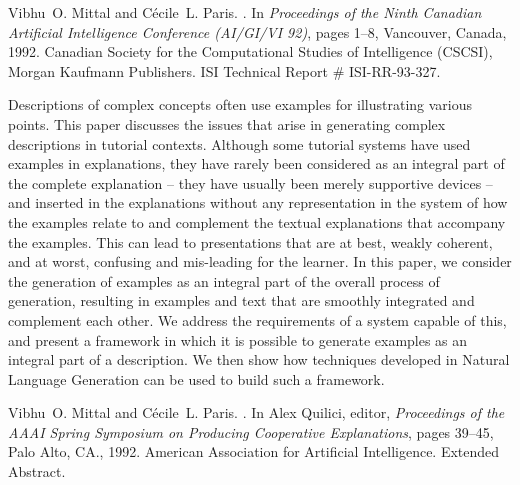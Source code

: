 \begin{thebibliography}{10}
Vibhu~O. Mittal and C{\'e}cile~L. Paris.
.
\newblock In {\em Proceedings of the Ninth Canadian Artificial Intelligence
  Conference (AI/GI/VI 92)}, pages 1--8, Vancouver, Canada, 1992. Canadian
  Society for the Computational Studies of Intelligence (CSCSI), Morgan
  Kaufmann Publishers.
\newblock ISI Technical Report \# ISI-RR-93-327.

{\leftskip=0.1in\rightskip=0.1in\begin{small}\par{}Descriptions of complex concepts often use examples for illustrating various
  points. This paper discusses the issues that arise in generating complex
  descriptions in tutorial contexts. Although some tutorial systems have used
  examples in explanations, they have rarely been considered as an integral
  part of the complete explanation -- they have usually been merely supportive
  devices -- and inserted in the explanations without any representation in the
  system of how the examples relate to and complement the textual explanations
  that accompany the examples. This can lead to presentations that are at best,
  weakly coherent, and at worst, confusing and mis-leading for the learner. In
  this paper, we consider the generation of examples as an integral part of the
  overall process of generation, resulting in examples and text that are
  smoothly integrated and complement each other. We address the requirements of
  a system capable of this, and present a framework in which it is possible to
  generate examples as an integral part of a description. We then show how
  techniques developed in Natural Language Generation can be used to build such
  a framework.\end{small}\par}
\noindent\hspace*{\itemindent}{\leftskip=0.1in\rightskip=0.1in\hrulefill}

Vibhu~O. Mittal and C{\'e}cile~L. Paris.
.
\newblock In Alex Quilici, editor, {\em Proceedings of the AAAI Spring
  Symposium on Producing Cooperative Explanations}, pages 39--45, Palo Alto,
  CA., 1992. American Association for Artificial Intelligence.
\newblock Extended Abstract.

\noindent\hspace*{\itemindent}{\leftskip=0.1in\rightskip=0.1in\hrulefill}


\end{thebibliography}
